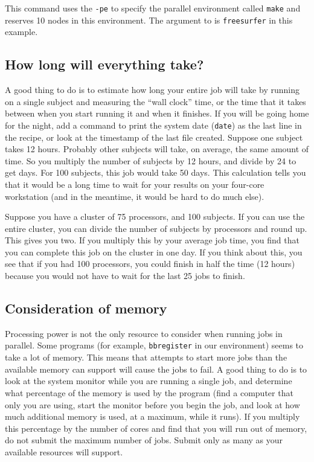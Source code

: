 This command uses the \texttt{-pe} to specify the parallel environment called \texttt{make} and reserves 10 nodes in this environment. The argument to \maken{} is \texttt{freesurfer} in this example.

\subsection{How long will everything take?}

A good thing to do is to estimate how long your entire job will take by running \maken{} on a single subject and measuring the ``wall clock'' time, or the time that it takes between when you start running it and when it finishes. If you will be going home for the night, add a command to print the system date (\texttt{date}) as the last line in the recipe, or look at the timestamp of the last file created. Suppose one subject takes 12 hours. Probably other subjects will take, on average, the same amount of time. So you multiply the number of subjects by 12 hours, and divide by 24 to get days. For 100 subjects, this job would take 50 days. This calculation tells you that it would be a long time to wait for your results on your four-core workstation (and in the meantime, it would be hard to do much else). 

Suppose you have a cluster of 75 processors, and 100 subjects. If you can use the entire cluster, you can divide the number of subjects by processors and round up. This gives you two. If you multiply this by your average job time, you find that you can complete this job on the cluster in one day. If you think about this, you see that if you had 100 processors, you could finish in half the time (12 hours) because you would not have to wait for the last 25 jobs to finish.

\subsection{Consideration of memory}

Processing power is not the only resource to consider when running jobs in parallel. Some programs (for example, \texttt{bbregister} in our environment) seems to take a lot of memory. This means that attempts to start more jobs than the available memory can support will cause the jobs to fail. A good thing to do is to look at the system monitor while you are running a single job, and determine what percentage of the memory is used by the program (find a computer that only you are using, start the monitor before you begin the job, and look at how much additional memory is used, at a maximum, while it runs). If you multiply this percentage by the number of cores and find that you will run out of memory, do not submit the maximum number of jobs. Submit only as many as your available resources will support.

